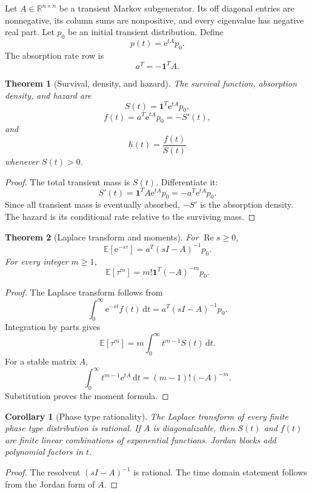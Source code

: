 \documentclass{aomart}
\newtheorem{theorem}{Theorem}[section]
\newtheorem{corollary}[corollary]{Corollary}
\theoremstyle{definition}
\theoremstyle{remark}
\newcommand{\RR}{\mathbb R}
\newcommand{\EE}{\mathbb E}
\newcommand{\one}{\mathbf 1}
\newcommand{\e}{\mathrm e}
\newcommand{\dd}{\,\mathrm d}
\begin{document}
Let \(A\in\RR^{n\times n}\) be a transient Markov subgenerator. Its off diagonal entries are nonnegative, its column sums are nonpositive, and every eigenvalue has negative real part. Let \(p_0\) be an initial transient distribution. Define
\[
p(t)=\e^{tA}p_0.
\]
The absorption rate row is
\[
a^T=-\one^TA.
\]

\begin{theorem}[Survival, density, and hazard]\label{thm:survival_density_hazard}
The survival function, absorption density, and hazard are
\[
\boxed{
S(t)=\one^T\e^{tA}p_0,
}
\]
\[
\boxed{
f(t)=a^T\e^{tA}p_0=-S'(t),
}
\]
and
\[
\boxed{
h(t)=\frac{f(t)}{S(t)}
}
\]
whenever \(S(t)>0\).
\end{theorem}

\begin{proof}
The total transient mass is \(S(t)\). Differentiate it:
\[
S'(t)=\one^TA\e^{tA}p_0=-a^T\e^{tA}p_0.
\]
Since all transient mass is eventually absorbed, \(-S'\) is the absorption density. The hazard is its conditional rate relative to the surviving mass.
\end{proof}

\begin{theorem}[Laplace transform and moments]\label{thm:survival_laplace_moments}
For \(\operatorname{Re}s\geq0\),
\[
\boxed{
\EE[\e^{-s\tau}]
=
a^T(sI-A)^{-1}p_0.
}
\]
For every integer \(m\geq1\),
\[
\boxed{
\EE[\tau^m]
=
m!\one^T(-A)^{-m}p_0.
}
\]
\end{theorem}

\begin{proof}
The Laplace transform follows from
\[
\int_0^\infty\e^{-st}f(t)\dd t
=
a^T(sI-A)^{-1}p_0.
\]
Integration by parts gives
\[
\EE[\tau^m]
=m\int_0^\infty t^{m-1}S(t)\dd t.
\]
For a stable matrix \(A\),
\[
\int_0^\infty t^{m-1}\e^{tA}\dd t
=(m-1)!(-A)^{-m}.
\]
Substitution proves the moment formula.
\end{proof}

\begin{corollary}[Phase type rationality]\label{cor:phase_type_rationality}
The Laplace transform of every finite phase type distribution is rational. If \(A\) is diagonalizable, then \(S(t)\) and \(f(t)\) are finite linear combinations of exponential functions. Jordan blocks add polynomial factors in \(t\).
\end{corollary}

\begin{proof}
The resolvent \((sI-A)^{-1}\) is rational. The time domain statement follows from the Jordan form of \(A\).
\end{proof}
\end{document}
